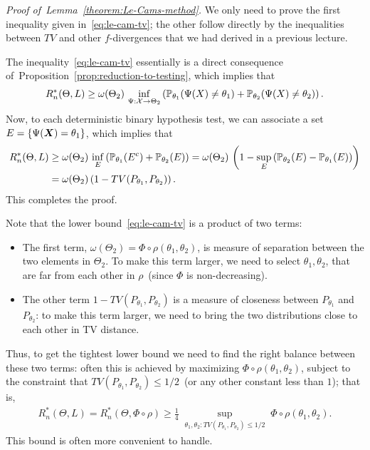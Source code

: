 \documentclass[12pt]{article}
\begin{document}
\emph{Proof of~Lemma~\ref{theorem:Le-Cams-method}.} 
We only need to prove the first inequality given in~\eqref{eq:le-cam-tv}; the other follow directly by the inequalities between $TV$ and other $f$-divergences that we had derived in a previous lecture. 

The inequality~\eqref{eq:le-cam-tv} essentially is a direct consequence of~Proposition~\ref{prop:reduction-to-testing}, which implies that 
\begin{align}
R_n^*(\Theta, L) \geq {\omega(\Theta_2)} \, \inf_{\Psi:{\cal X} \to \Theta_2} \left( \mathbb{P}_{\theta_1}(\Psi(X) \neq \theta_1) + \mathbb{P}_{\theta_2}(\Psi(X) \neq \theta_2) \right). 
\end{align}
Now, to each deterministic binary hypothesis test, we can associate a set $E = \{\Psi({\boldsymbol X}) = \theta_1\}$, which implies that 
\begin{align}
R_n^*(\Theta, L) &\geq {\omega(\Theta_2)} \, \inf_{E} \left( \mathbb{P}_{\theta_1}(E^c) + \mathbb{P}_{\theta_2}(E) \right) = {\omega(\Theta_2)} \,\left( 1 -    \sup_{E} \left(  \mathbb{P}_{\theta_2}(E) - \mathbb{P}_{\theta_1}(E) \right) \right) \\ 
& = {\omega(\Theta_2)} \left( 1 - TV(P_{\theta_1}, P_{\theta_2}) \right). 
\end{align}
This completes the proof. 
\hfill \qedsymbol

Note that the lower bound~\eqref{eq:le-cam-tv} is a product of two terms: 
\begin{itemize}
	\item The first term, $\omega(\Theta_2) = \Phi \circ \rho(\theta_1, \theta_2)$, is measure of separation between the two elements in $\Theta_2$. To make this term larger, we need to select $\theta_1, \theta_2$, that are far from each other in $\rho$~(since $\Phi$ is non-decreasing). 

	\item The other term $1 - TV(P_{\theta_1}, P_{\theta_2})$ is a measure of closeness between $P_{\theta_1}$ and $P_{\theta_2}$: to make this term larger, we need to bring the two distributions close to each other in TV distance. 
\end{itemize}
Thus, to get the tightest lower bound we need to find the right balance between these two terms: often this is achieved by maximizing $\Phi \circ \rho(\theta_1, \theta_2)$, subject to the constraint that $TV(P_{\theta_1}, P_{\theta_2}) \leq 1/2$~(or any other constant less than $1$); that is, 
\begin{align}
R_n^*(\Theta, L) = R_n^*(\Theta, \Phi \circ \rho) \geq \frac{1}{4} \; \sup_{\theta_1, \theta_2: TV(P_{\theta_1}, P_{\theta_2}) \leq 1/2} \; \Phi \circ \rho(\theta_1, \theta_2).   \label{eq:le-cam-tv-2}
\end{align} 
This bound is often more convenient to handle. 
\end{document}
